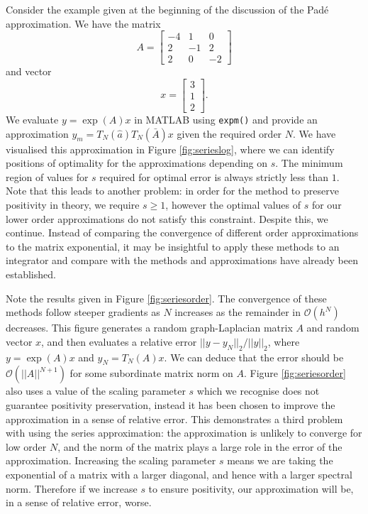 Consider the example given at the beginning of the discussion of the Pad\'e approximation.
We have the matrix
\begin{equation*}
    A = \begin{bmatrix}
        -4 & 1 & 0 \\
        2 & -1 & 2 \\
        2 & 0 & -2
    \end{bmatrix}
\end{equation*}
and vector
\begin{equation*}
    x = \begin{bmatrix}
        3 \\
        1 \\
        2
    \end{bmatrix}.
\end{equation*}
We evaluate $y = \exp(A)x$ in MATLAB using \texttt{expm()} and provide an approximation $y_m = T_N(\hat{a})T_N(\bar{A})x$ given the required order $N$.
We have visualised this approximation in Figure \ref{fig:serieslog}, where we can identify positions of optimality for the approximations depending on $s$.
The minimum region of values for $s$ required for optimal error is always strictly less than $1$.
Note that this leads to another problem: in order for the method to preserve positivity in theory, we require $s \ge 1$, however the optimal values of $s$ for our lower order approximations do not satisfy this constraint.
Despite this, we continue. 
Instead of comparing the convergence of different order approximations to the matrix exponential,
it may be insightful to apply these methods to an integrator and compare with the methods and approximations have already been established.

Note the results given in Figure \ref{fig:seriesorder}. The convergence of these methods follow steeper gradients as $N$ increases as the remainder in $\mathcal{O}(h^N)$ decreases.
This figure generates a random graph-Laplacian matrix $A$ and random vector $x$, and then evaluates a relative error $||y-y_N||_2/||y||_2$,
where $y = \exp(A)x$ and $y_N = T_N(A)x$.
We can deduce that the error should be $\mathcal{O}(||A||^{N+1})$ for some subordinate matrix norm on $A$.
Figure \ref{fig:seriesorder} also uses a value of the scaling parameter $s$ which we recognise does not guarantee positivity preservation,
instead it has been chosen to improve the approximation in a sense of relative error.
This demonstrates a third problem with using the series approximation: the approximation is unlikely to converge for low order $N$,
and the norm of the matrix plays a large role in the error of the approximation.
Increasing the scaling parameter $s$ means we are taking the exponential of a matrix with a larger diagonal, and hence with a larger spectral norm.
Therefore if we increase $s$ to ensure positivity, our approximation will be, in a sense of relative error, worse.

